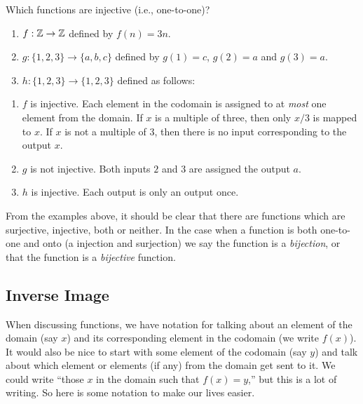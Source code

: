 \documentclass[12pt]{article}
\begin{document}
\begin{example}
  Which functions are injective (i.e., one-to-one)?
    \begin{enumerate}
    \item $f:\mathbb Z \to \mathbb Z$ defined by $f(n) = 3n$.  
    \item $g: \{1,2,3\} \to \{a,b,c\}$ defined by $g(1) = c$, $g(2) = a$ and $g(3) = a$.  
    \item $h:\{1,2,3\} \to \{1,2,3\}$ defined as follows:
    \begin{center}
    \end{center}
  \end{enumerate}
  \begin{solution}
    \begin{enumerate}
      \item $f$ is injective.  Each element in the codomain is assigned to at \emph{most} one element from the domain.  If $x$ is a multiple of three, then only $x/3$ is mapped to $x$.  If $x$ is not a multiple of 3, then there is no input corresponding to the output $x$.
      \item $g$ is not injective.  Both inputs $2$ and $3$ are assigned the output $a$.
      \item $h$ is injective.  Each output is only an output once.
    \end{enumerate}

  \end{solution}

\end{example}



From the examples above, it should be clear that there are functions which are surjective, injective, both or neither.  In the case when a function is both one-to-one and onto (a injection and surjection) we say the function is a \emph{bijection}, or that the function is a \emph{bijective} function.  

\subsection{Inverse Image}

When discussing functions, we have notation for talking about an element of the domain (say $x$) and its corresponding element in the codomain (we write $f(x)$).  It would also be nice to start with some element of the codomain (say $y$) and talk about which element or elements (if any) from the domain get sent to it.  We could write ``those $x$ in the domain such that $f(x) = y$,'' but this is a lot of writing.  So here is some notation to make our lives easier.
\end{document}
